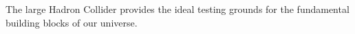 The large Hadron Collider provides the ideal testing grounds for the fundamental
building blocks of our universe.
